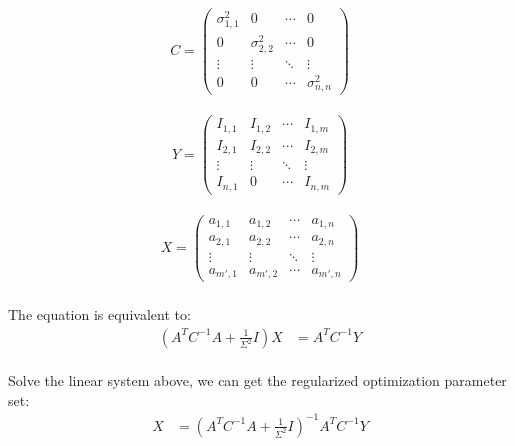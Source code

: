 \documentclass[]{article}
\begin{document}
\begin{align*}
C = 
 \begin{pmatrix}
  \sigma^2_{1,1} & 0 & \cdots & 0 \\
  0 & \sigma^2_{2,2} & \cdots & 0 \\
  \vdots  & \vdots  & \ddots & \vdots  \\
  0 & 0& \cdots & \sigma^2_{n,n}
 \end{pmatrix}
\end{align*}

\begin{align*}
Y = 
 \begin{pmatrix}
  I_{1,1} & I_{1,2} & \cdots & I_{1,m}\\
  I_{2,1} & I_{2,2} & \cdots & I_{2,m} \\
  \vdots  & \vdots  & \ddots & \vdots  \\
  I_{n,1}& 0& \cdots & I_{n,m}
 \end{pmatrix}
\end{align*}

\begin{align*}
X=
 \begin{pmatrix}
  a_{1,1} & a_{1,2} & \cdots & a_{1,n} \\
  a_{2,1} & a_{2,2} & \cdots & a_{2,n} \\
  \vdots  & \vdots  & \ddots & \vdots  \\
  a_{m',1} & a_{m',2} & \cdots & a_{m',n}
 \end{pmatrix}
\end{align*}
\\
The equation is equivalent to:
\begin{align*}
(A^TC^{-1}A+\frac{1}{\Sigma^2}I)X &= A^TC^{-1}Y
\end{align*}
\\
Solve the linear system above, we can get the regularized optimization parameter set:
\begin{align*}
X &=(A^TC^{-1}A+\frac{1}{\Sigma^2}I)^{-1} A^TC^{-1}Y
\end{align*}
\end{document}
